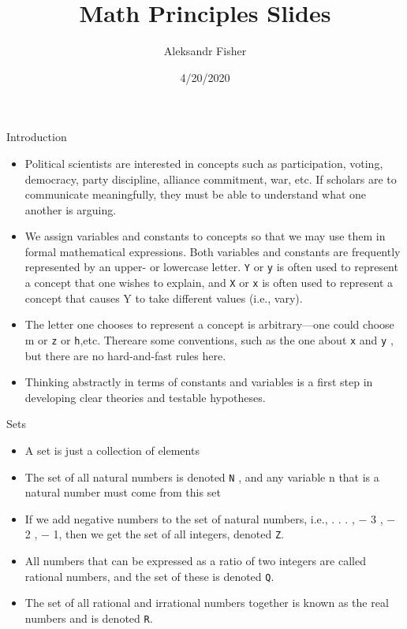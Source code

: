 \documentclass[
  ignorenonframetext,
]{beamer}
\title{Math Principles Slides}
\author{Aleksandr Fisher}
\date{4/20/2020}
\providecommand{\tightlist}{%
  \setlength{\itemsep}{0pt}\setlength{\parskip}{0pt}}
\begin{document}
\frame{\titlepage}

\begin{frame}[fragile]{Introduction}
\protect\hypertarget{introduction}{}

\begin{itemize}
\item
  Political scientists are interested in concepts such as participation,
  voting, democracy, party discipline, alliance commitment, war, etc. If
  scholars are to communicate meaningfully, they must be able to
  understand what one another is arguing.
\item
  We assign variables and constants to concepts so that we may use them
  in formal mathematical expressions. Both variables and constants are
  frequently represented by an upper- or lowercase letter. \texttt{Y} or
  \texttt{y} is often used to represent a concept that one wishes to
  explain, and \texttt{X} or \texttt{x} is often used to represent a
  concept that causes Y to take different values (i.e., vary).
\item
  The letter one chooses to represent a concept is arbitrary---one could
  choose m or \texttt{z} or \texttt{h},etc. Thereare some conventions,
  such as the one about \texttt{x} and \texttt{y} , but there are no
  hard-and-fast rules here.
\item
  Thinking abstractly in terms of constants and variables is a first
  step in developing clear theories and testable hypotheses.
\end{itemize}

\end{frame}

\begin{frame}[fragile]{Sets}
\protect\hypertarget{sets}{}

\begin{itemize}
\tightlist
\item
  A set is just a collection of elements
\item
  The set of all natural numbers is denoted \texttt{N} , and any
  variable n that is a natural number must come from this set
\item
  If we add negative numbers to the set of natural numbers, i.e., . . .
  , − 3 , − 2 , − 1, then we get the set of all integers, denoted
  \texttt{Z}.
\item
  All numbers that can be expressed as a ratio of two integers are
  called rational numbers, and the set of these is denoted \texttt{Q}.
\item
  The set of all rational and irrational numbers together is known as
  the real numbers and is denoted \texttt{R}.
\end{itemize}

\end{frame}
\end{document}
